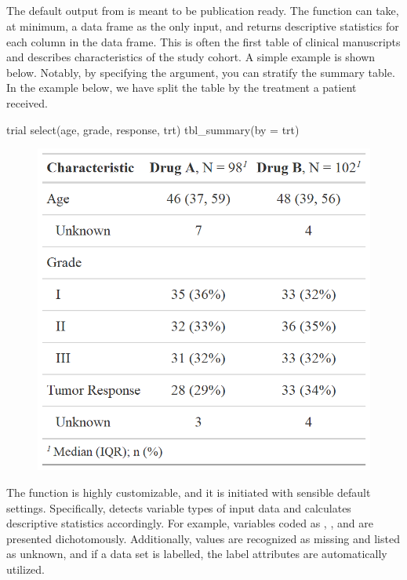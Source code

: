 

\subsection{\texorpdfstring{}{tbl\_summary()}}

The default output from  is meant to be publication ready.
The  function can take, at minimum, a data frame as the only input, and returns descriptive statistics for each column in the data frame.
This is often the first table of clinical manuscripts and describes characteristics of the study cohort.
A simple example is shown below.
Notably, by specifying the  argument, you can stratify the summary table. 
In the example below, we have split the table by the treatment a patient received. 

\newpage
\begin{example}
trial %
  select(age, grade, response, trt) %
  tbl_summary(by = trt)
\end{example}
\begin{figure}[h!]
  \includegraphics[scale=0.35]{summary_basic.png}
  \centering
\end{figure}

The function is highly customizable, and it is initiated with sensible default settings.
Specifically,  detects variable types of input data and calculates descriptive statistics accordingly.
For example, variables coded as , , and  are presented dichotomously.
Additionally,  values are recognized as missing and listed as unknown, and if a data set is labelled, the label attributes are automatically utilized. 

